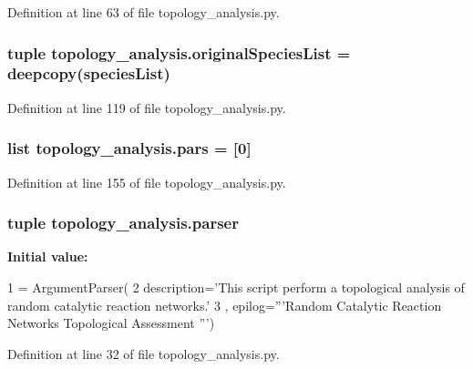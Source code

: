 Definition at line 63 of file topology\-\_\-analysis.\-py.

\hypertarget{a00157_a62b034cfe14eff36f09dd65a51ae7c9c}{
\subsubsection[{original\-Species\-List}]{\setlength{\rightskip}{0pt plus 5cm}tuple topology\-\_\-analysis.\-original\-Species\-List = deepcopy({\bf species\-List})}}\label{a00157_a62b034cfe14eff36f09dd65a51ae7c9c}


Definition at line 119 of file topology\-\_\-analysis.\-py.

\hypertarget{a00157_a516f339905d01b02a4e16181f2fde4be}{
\subsubsection[{pars}]{\setlength{\rightskip}{0pt plus 5cm}list topology\-\_\-analysis.\-pars = \mbox{[}0\mbox{]}}}\label{a00157_a516f339905d01b02a4e16181f2fde4be}


Definition at line 155 of file topology\-\_\-analysis.\-py.

\hypertarget{a00157_aeff833532f5cd31a9720a78cc0f8d97b}{
\subsubsection[{parser}]{\setlength{\rightskip}{0pt plus 5cm}tuple topology\-\_\-analysis.\-parser}}\label{a00157_aeff833532f5cd31a9720a78cc0f8d97b}
{\bfseries Initial value\-:}
\begin{DoxyCode}
1 = ArgumentParser(
2                                 description=\textcolor{stringliteral}{'This script perform a topological analysis of random catalytic
       reaction networks.'}
3                                 , epilog=\textcolor{stringliteral}{'''Random Catalytic Reaction Networks Topological Assessment '''})
\end{DoxyCode}


Definition at line 32 of file topology\-\_\-analysis.\-py.

